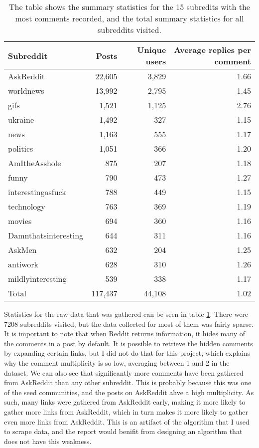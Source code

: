 \documentclass[
]{article}
\begin{document}
\begin{table}

\caption{\label{tab:rawdata}The table shows the summary statistics for the 15 subredits with the most comments recorded, and the total summary statistics for all subreddits visited.}
\centering
\begin{tabular}[t]{lrrr}
\toprule
Subreddit & Posts & Unique users & Average replies per comment\\
\midrule
AskReddit & 22,605 & 3,829 & 1.66\\
worldnews & 13,992 & 2,795 & 1.45\\
gifs & 1,521 & 1,125 & 2.76\\
ukraine & 1,492 & 327 & 1.15\\
news & 1,163 & 555 & 1.17\\
\addlinespace
politics & 1,051 & 366 & 1.20\\
AmItheAsshole & 875 & 207 & 1.18\\
funny & 790 & 473 & 1.27\\
interestingasfuck & 788 & 449 & 1.15\\
technology & 763 & 369 & 1.19\\
\addlinespace
movies & 694 & 360 & 1.16\\
Damnthatsinteresting & 644 & 311 & 1.16\\
AskMen & 632 & 204 & 1.25\\
antiwork & 628 & 310 & 1.26\\
mildlyinteresting & 539 & 338 & 1.17\\
\midrule
\addlinespace
Total & 117,437 & 44,108 & 1.02\\
\bottomrule
\end{tabular}
\end{table}

Statistics for the raw data that was gathered can be seen in table \ref{tab:rawdata}. There were 7208 subreddits visited, but the data collected for most of them was fairly sparse. It is important to note that when Reddit returns information, it hides many of the comments in a post by default. It is possible to retrieve the hidden comments by expanding certain links, but I did not do that for this project, which explains why the comment multiplicity is so low, averaging between 1 and 2 in the dataset. We can also see that significantly more comments have been gathered from AskReddit than any other subreddit. This is probably because this was one of the seed communities, and the posts on AskReddit ahve a high multiplicity. As such, many links were gathered from AskReddit early, making it more likely to gather more links from AskReddit, which in turn makes it more likely to gather even more links from AskReddit. This is an artifact of the algorithm that I used to scrape data, and the report would benifit from designing an algorithm that does not have this weakness.
\end{document}

